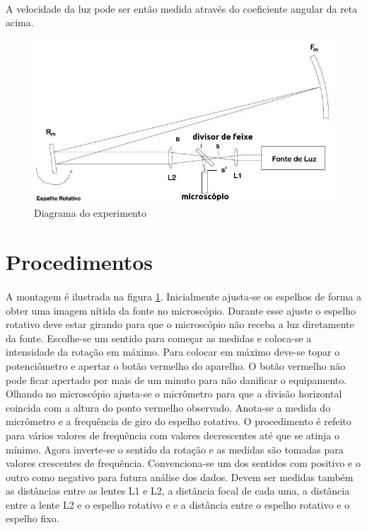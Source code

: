 \documentclass[a4paper,11pt]{article}
\begin{document}
\paragraph{}A velocidade da luz pode ser então medida
através do coeficiente angular da reta acima. 
\FloatBarrier
\begin{figure}[!htp]
  \centering 
  \includegraphics[scale=0.7]{./images/montagem.jpg}
  \caption{Diagrama do experimento}
  \label{fig:diagrama}
\end{figure}
\FloatBarrier

\newpage
\section{Procedimentos}
\paragraph{} A montagem é ilustrada na figura
\ref{fig:diagrama}. Inicialmente ajusta-se os espelhos de forma
a obter uma imagem nítida da fonte no microscópio.
Durante esse ajuste o espelho rotativo deve estar girando para
que o microscópio não receba a luz diretamente da fonte. Escolhe-se um 
sentido para começar as medidas e coloca-se a intensidade da rotação
em máximo. Para colocar em máximo deve-se topar o potenciômetro e apertar o 
botão vermelho do aparelho. O botão vermelho não pode ficar apertado por mais de um minuto
para não danificar o equipamento. Olhando no microscópio ajusta-se o micrômetro 
para que a divisão
horizontal coincida com a altura do ponto vermelho observado. Anota-se
a medida do micrômetro e a frequência de giro do espelho
rotativo. O procedimento é refeito para vários valores de 
frequência com valores decrescentes até que se atinja o mínimo. Agora inverte-se 
o sentido da rotação e as medidas são tomadas para valores crescentes de frequência. 
Convenciona-se um dos sentidos com positivo e o outro como negativo para 
futura análise dos dados. Devem ser medidas também as distâncias entre
as lentes L1 e L2, a distância focal de cada uma, a distância entre a lente L2
e o espelho rotativo e e a distância entre o espelho
rotativo e o espelho fixo.
\end{document}
